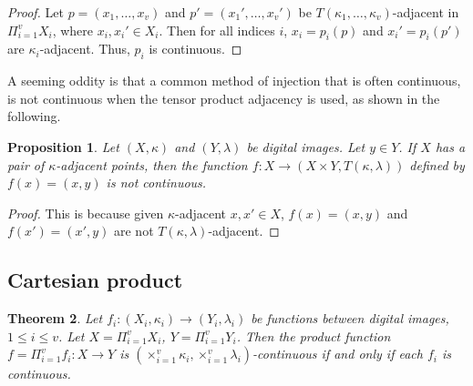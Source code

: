 \documentclass{article}
\theoremstyle{plain}
\newtheorem{thm}{Theorem}
\newtheorem{prop}[thm]{Proposition}
\theoremstyle{definition}
\newtheorem{exl}[thm]{Example}
\numberwithin{thm}{section}
\def\Z{{\mathbb Z}}
\begin{document}
\begin{proof} Let $p=(x_1, \ldots, x_v)$ and
$p'=(x_1', \ldots,x_v')$ be
$T(\kappa_1, \ldots, \kappa_v)$-adjacent in
$\Pi_{i=1}^v X_i$, 
where $x_i,x_i' \in X_i$. Then for all indices $i$,
$x_i=p_i(p)$ and $x_i'=p_i(p')$ are
$\kappa_i$-adjacent. Thus, $p_i$ is continuous.
\end{proof}

\begin{comment}
The statement analogous to 
Theorem~\ref{projection-cont} is not generally true if a $c_u$-adjacency
is used instead of a normal product adjacency, as shown in the following.

\begin{exl}
\cite{BoxKar12}
Let $X=[0,1]_{\Z} \subset \Z$.
Let $Y=\{(0,0),(1,1)\} \subset \Z^2$.
Then the projection map
$p_2: (X \times Y, c_3) \to (Y,c_1)$ is
not continuous, since $X \times Y$ 
is $c_3$-connected and $Y$ is not
$c_1$-connected. \qed
\end{exl}
\end{comment}

A seeming oddity is that a common method of
injection that is often continuous, is not continuous when the tensor product
adjacency is used, as shown in the following.

\begin{prop}
\label{natural-inject-not-cont}
Let $(X,\kappa)$ and $(Y,\lambda)$ be
digital images. Let $y \in Y$. If $X$ has a pair of $\kappa$-adjacent points, then the
function $f: X \to (X \times Y,T(\kappa,\lambda))$ defined by
$f(x)=(x,y)$ is not continuous.
\end{prop}

\begin{proof} This is because given $\kappa$-adjacent
$x,x' \in X$, $f(x)=(x,y)$ and
$f(x')=(x',y)$ are not $T(\kappa,\lambda)$-adjacent.
\end{proof}

\subsection{Cartesian product}
\begin{thm}
\label{Cart-prod-cont}
Let $f_i: (X_i,\kappa_i) \to (Y_i,\lambda_i)$ be functions
between digital images, $1 \le i \le v$.
Let $X=\Pi_{i=1}^v X_i$, $Y=\Pi_{i=1}^v Y_i$. 
Then the product
function $f=\Pi_{i=1}^v f_i: X \to Y$ is $(\times_{i=1}^v \kappa_i, \times_{i=1}^v \lambda_i)$-continuous if 
and only if each $f_i$ is continuous.
\end{thm}
\end{document}
